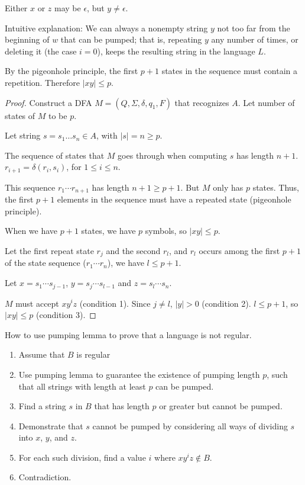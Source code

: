 {\color{blue} Either $x$ or $z$ may be $\epsilon$, but $y \neq \epsilon$.}

Intuitive explanation: We can always a nonempty string $y$ not too far from the beginning of $w$ that can be pumped; that is, repeating $y$ any number of times, or deleting it (the case $i = 0$), keeps the resulting string in the language $L$.

By the pigeonhole principle, the first $p+1$ states in the sequence must contain a repetition. Therefore $|xy| \leq p$.

\begin{mdframed}
\begin{proof}
Construct a DFA $M = (Q, \Sigma, \delta, q_1, F)$ that recognizes $A$. Let number of states of $M$ to be $p$.

Let string $s = s_1\ldots s_n \in A$, with $|s| = n \geq p$.

The sequence of states that $M$ goes through when computing $s$ has length $n+1$. $r_{i+1} = \delta(r_i ,s_i)$, for $1 \leq i \leq n$.

This sequence $r_1\cdots r_{n+1}$ has length $n+1 \geq p+1$. But $M$ only has $p$ states. Thus, the first $p+1$ elements in the sequence must have a repeated state (pigeonhole principle). 

{\color{blue} When we have $p+1$ states, we have $p$ symbols, so $|xy|\leq p$.}

Let the first repeat state $r_j$ and the second $r_l$, and $r_l$ occurs among the first $p+1$ of the state sequence ($r_1\cdots r_n$), we have $l \leq p+1$.

Let $x = s_1 \cdots s_{j-1}$, $y = s_j \cdots s_{l-1}$ and $z = s_l\cdots s_n$.

$M$ must accept $xy^iz$ (condition 1). Since $j \neq l$, $|y| > 0$ (condition 2). $l \leq p+1$, so $|xy| \leq p$ (condition 3).
\end{proof}
\end{mdframed}

How to use pumping lemma to prove that a language is not regular.
\begin{enumerate}
\item Assume that $B$ is regular
\item Use pumping lemma to guarantee the existence of pumping length $p$, such that all strings with length at least $p$ can be pumped.
\item Find a string $s$ in $B$ that has length $p$ or greater but cannot be pumped.
\item Demonstrate that $s$ cannot be pumped by considering all ways of dividing $s$ into $x$, $y$, and $z$.
\item For each such division, find a value $i$ where $xy^iz \not \in B$.
\item Contradiction.
\end{enumerate}